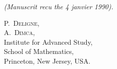 \documentclass[12pt,a4paper]{article}
\theoremstyle{plain}
\theoremstyle{definition}
\begin{document}
\vfill

\begin{flushright}
\textit{(Manuscrit recu the 4 janvier 1990).}
\end{flushright}

\begin{center}
\textsc{P.\ Deligne,}\\
\textsc{A.\ Dimca,}\\
Institute for Advanced Study,\\
School of Mathematics,\\
Princeton, New Jersey, USA.
\end{center}
\end{document}
